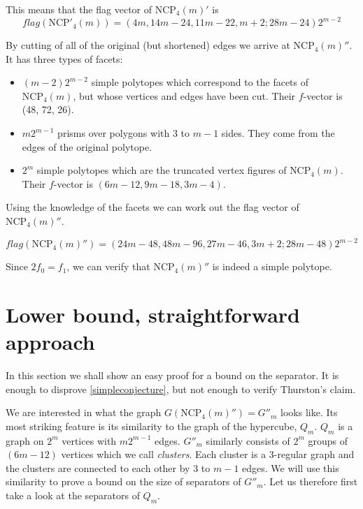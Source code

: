 \documentclass[a4paper,12pt]{book}
\theoremstyle{plain}
\theoremstyle{definition}
\newcommand\NC{\textrm{NCP}}
\begin{document}
This means that the flag vector of $\NC_4(m)'$ is 
\begin{equation}
 flag(\NC'_4(m)) = (4m, 14m-24, 11m-22, m+2; 28m-24)2^{m-2}
\end{equation}

By cutting of all of the original (but shortened) edges we arrive at 
$\NC_4(m)''$. It has three types of facets:

\begin{itemize}
 \item $(m-2)2^{m-2}$ simple polytopes which correspond to the facets of 
$\NC_4(m)$, but whose vertices and edges have been cut. Their $f$-vector is 
(48, 72, 26).
\item $m2^{m-1}$ prisms over polygons with $3$ to $m-1$ sides. They come from 
the edges of the original polytope.
\item $2^m$ simple polytopes which are the truncated vertex figures of 
$\NC_4(m)$. Their $f$-vector is $(6m - 12, 9m-18, 3m-4)$.
\end{itemize}

Using the knowledge of the facets we can work out the flag vector of 
$\NC_4(m)''$.

\begin{equation}
 flag(\NC_4(m)'') = (24m-48, 48m-96, 27m - 46, 3m+2; 28m -48)2^{m-2}
\end{equation}

Since $2f_0 = f_1$, we can verify that $\NC_4(m)''$ is indeed a simple 
polytope.

\section{Lower bound, straightforward approach}

In this section we shall show an easy proof for a bound on the separator. It
is enough to disprove \ref{simpleconjecture}, but not enough to verify Thurston's
claim.

We are interested in what the graph $G(\NC_4(m)'') = G''_m$ looks like. Its 
most striking feature is its similarity to the graph of the hypercube, $Q_m$. 
$Q_m$ is a graph on $2^m$ vertices with $m2^{m-1}$ edges. $G''_m$ 
similarly consists of $2^m$ groups of $(6m-12)$ vertices which we call 
\textit{clusters}. Each cluster is a 3-regular graph and the clusters are 
connected to each other by 3 to $m-1$ edges. We will use this similarity to 
prove a bound on the size of separators of $G''_m$. Let us therefore first take a 
look at the separators of $Q_m$.
\end{document}
